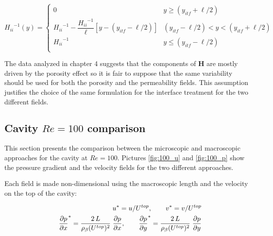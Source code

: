 \begin{equation}
{H_{ii}}^{-1}(y) = 
\begin{cases}
0 & y\geqslant(y_{itf}+\ell/2) \\
{H_{ii}}^{-1} - \dfrac{{H_{ii}}^{-1}}{\ell}\left[y -\left(y_{itf} -\ell/2\right)\right] &  (y_{itf}-\ell/2)<y<(y_{itf}+\ell/2)\\
{H_{ii}}^{-1} &y\leqslant(y_{itf}-\ell/2) \\
\end{cases}
\label{eq:permeability_fun}
\end{equation}

The data analyzed in chapter 4 suggests that the components of $\mathbf{H}$ are mostly driven by the porosity effect so it is fair to suppose that the same variability should be used for both the porosity and the permeability fields. This assumption justifies the choice of the same formulation for the interface treatment for the two different fields.

\newpage
\subsection{Cavity $Re=100$ comparison}

This section presents the comparison between the microscopic and macroscopic approaches for the cavity at $Re=100$. Pictures \ref{fig:100_u} and \ref{fig:100_p} show the pressure gradient and the velocity fields for the two different approaches.


Each field is made non-dimensional using the macroscopic length and the velocity on the top of the cavity:

\begin{eqnarray}
&& u^* = u/{U^{top}}, \qquad v^* = v/{U^{top}} \nonumber \\
&& \dfrac{\partial p}{\partial x}^* = \dfrac{2 \, L}{ \rho_{\beta} {(U^{top})^2 }}  \; \dfrac{\partial p}{\partial x}  , \qquad \dfrac{\partial p}{\partial y}^* = \dfrac{2 \, L}{ \rho_{\beta} {(U^{top})^2 }} \; \dfrac{\partial p}{\partial y}  \nonumber
\end{eqnarray}


